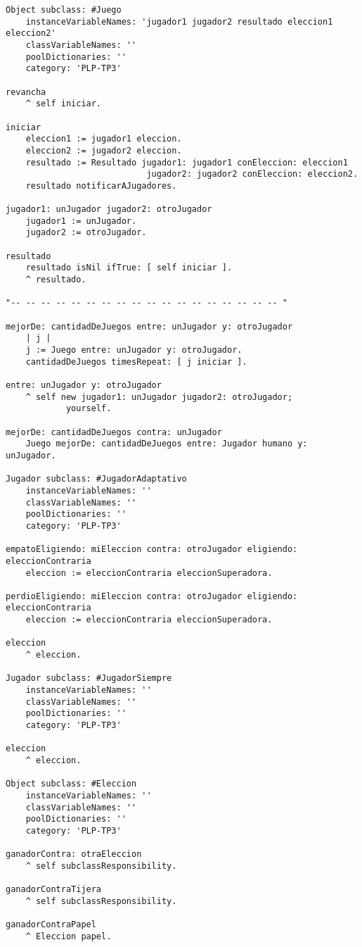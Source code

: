\documentclass[10pt, a4paper,english,spanish,hidelinks]{article}
\begin{document}
\begin{verbatim}
Object subclass: #Juego
	instanceVariableNames: 'jugador1 jugador2 resultado eleccion1 eleccion2'
	classVariableNames: ''
	poolDictionaries: ''
	category: 'PLP-TP3'

revancha
	^ self iniciar. 

iniciar
	eleccion1 := jugador1 eleccion.
	eleccion2 := jugador2 eleccion.
	resultado := Resultado jugador1: jugador1 conEleccion: eleccion1
				 			jugador2: jugador2 conEleccion: eleccion2.
	resultado notificarAJugadores. 

jugador1: unJugador jugador2: otroJugador 
	jugador1 := unJugador.
	jugador2 := otroJugador. 

resultado
	resultado isNil ifTrue: [ self iniciar ].
	^ resultado. 

"-- -- -- -- -- -- -- -- -- -- -- -- -- -- -- -- -- -- "

mejorDe: cantidadDeJuegos entre: unJugador y: otroJugador
	| j |
	j := Juego entre: unJugador y: otroJugador.
	cantidadDeJuegos timesRepeat: [ j iniciar ]. 

entre: unJugador y: otroJugador 
	^ self new jugador1: unJugador jugador2: otroJugador;
			yourself. 

mejorDe: cantidadDeJuegos contra: unJugador
	Juego mejorDe: cantidadDeJuegos entre: Jugador humano y: unJugador. 

Jugador subclass: #JugadorAdaptativo
	instanceVariableNames: ''
	classVariableNames: ''
	poolDictionaries: ''
	category: 'PLP-TP3'

empatoEligiendo: miEleccion contra: otroJugador eligiendo: eleccionContraria 
	eleccion := eleccionContraria eleccionSuperadora.  

perdioEligiendo: miEleccion contra: otroJugador eligiendo: eleccionContraria 
	eleccion := eleccionContraria eleccionSuperadora.  

eleccion
	^ eleccion. 

Jugador subclass: #JugadorSiempre
	instanceVariableNames: ''
	classVariableNames: ''
	poolDictionaries: ''
	category: 'PLP-TP3'

eleccion
	^ eleccion. 

Object subclass: #Eleccion
	instanceVariableNames: ''
	classVariableNames: ''
	poolDictionaries: ''
	category: 'PLP-TP3'

ganadorContra: otraEleccion
	^ self subclassResponsibility. 

ganadorContraTijera
	^ self subclassResponsibility. 

ganadorContraPapel
	^ Eleccion papel. 


\end{verbatim}
\end{document}
